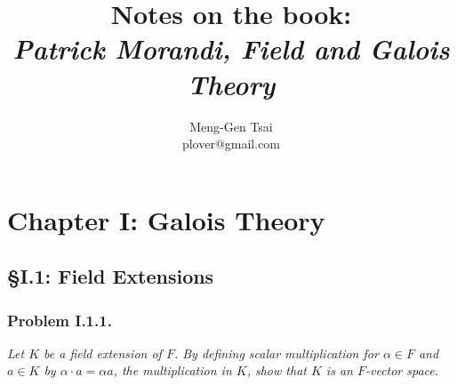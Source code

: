 \documentclass{article}
\title{\textbf{Notes on the book: \\ \emph{Patrick Morandi, Field and Galois Theory}}}
\author{Meng-Gen Tsai \\ plover@gmail.com}
\begin{document}
\maketitle
\tableofcontents












\newpage
\section*{Chapter I: Galois Theory \\}



\subsection*{\S I.1: Field Extensions \\}



\subsubsection*{Problem I.1.1.}
\emph{Let $K$ be a field extension of $F$.
By defining scalar multiplication for $\alpha \in F$ and $a \in K$
by $\alpha \cdot a = \alpha a$, the multiplication in $K$,
show that $K$ is an $F$-vector space.} \\
\end{document}

